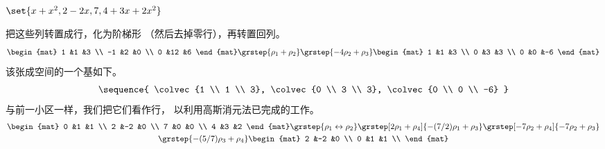 \begin{exercises}
\begin{exparts}
      \partsitem $\set{x+x^2, 2-2x, 7, 4+3x+2x^2}$
    \end{exparts}
    \begin{answer}
      \begin{exparts}
        \partsitem
          把这些列转置成行，化为阶梯形
          （然后去掉零行），再转置回列。
          \begin{equation*}
            \begin{mat}
              1 &1  &3 \\
             -1 &2  &0 \\
              0 &12 &6
            \end{mat}
            \grstep{\rho_1+\rho_2}
            \grstep{-4\rho_2+\rho_3}
            \begin{mat}
              1 &1  &3 \\
              0 &3  &3 \\
              0 &0  &-6
            \end{mat}
          \end{equation*}
          该张成空间的一个基如下。
          \begin{equation*}
            \sequence{
              \colvec{1 \\ 1 \\ 3},
              \colvec{0 \\ 3 \\ 3},
              \colvec{0 \\ 0 \\ -6}
          }
          \end{equation*}
       \partsitem
          与前一小区一样，我们把它们看作行，
          以利用高斯消元法已完成的工作。
          \begin{multline*}
            \begin{mat}
              0 &1  &1 \\
              2 &-2 &0 \\
              7 &0 &0 \\
              4 &3  &2
            \end{mat}
            \grstep{\rho_1\leftrightarrow\rho_2}
            \grstep[2\rho_1+\rho_4]{-(7/2)\rho_1+\rho_3}
            \grstep[-7\rho_2+\rho_4]{-7\rho_2+\rho_3}          \\
            \grstep{-(5/7)\rho_3+\rho_4}
            \begin{mat}
              2 &-2  &0 \\
              0 &1 &1 \\

\end{mat}
\end{multline*}
\end{exparts}
\end{answer}
\end{exercises}
